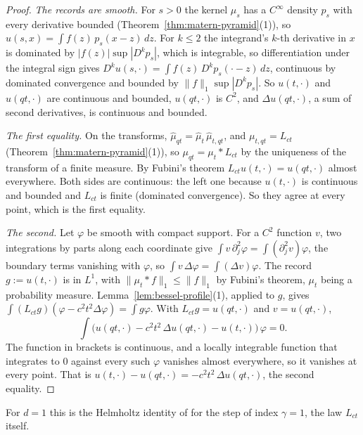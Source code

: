 \begin{proof}
\emph{The records are smooth.} For $s > 0$ the kernel $\mu_s$ has a $C^\infty$ density $p_s$ with
every derivative bounded (Theorem~\ref{thm:matern-pyramid}(1)), so
$u(s, x) = \int f(z)\,p_s(x - z)\,dz$. For $k \le 2$ the integrand's $k$-th derivative in $x$ is
dominated by $|f(z)|\sup|D^kp_s|$, which is integrable, so differentiation under the integral sign
gives $D^ku(s, \cdot) = \int f(z)\,D^kp_s(\cdot - z)\,dz$, continuous by dominated convergence and
bounded by $\|f\|_1\sup|D^kp_s|$. So $u(t, \cdot)$ and $u(qt, \cdot)$ are continuous and bounded,
$u(qt, \cdot)$ is $C^2$, and $\Delta u(qt, \cdot)$, a sum of second derivatives, is continuous and
bounded.

\emph{The first equality.} On the transforms, $\widehat\mu_{qt} = \widehat\mu_t\,\widehat\mu_{t,qt}$, and
$\mu_{t,qt} = L_{ct}$ (Theorem~\ref{thm:matern-pyramid}(1)), so $\mu_{qt} = \mu_t * L_{ct}$ by the
uniqueness of the transform of a finite measure. By Fubini's theorem
$L_{ct}u(t, \cdot) = u(qt, \cdot)$ almost everywhere. Both sides are continuous: the left one
because $u(t, \cdot)$ is continuous and bounded and $L_{ct}$ is finite (dominated convergence). So
they agree at every point, which is the first equality.

\emph{The second.} Let $\varphi$ be smooth with compact support. For a $C^2$ function $v$, two
integrations by parts along each coordinate give $\int v\,\partial_j^2\varphi = \int
(\partial_j^2 v)\varphi$, the boundary terms vanishing with $\varphi$, so
$\int v\,\Delta\varphi = \int (\Delta v)\varphi$. The record $g := u(t, \cdot)$ is in $L^1$, with
$\|\mu_t * f\|_1 \le \|f\|_1$ by Fubini's theorem, $\mu_t$ being a probability measure.
Lemma~\ref{lem:bessel-profile}(1), applied to $g$, gives $\int (L_{ct}g)(\varphi - c^2t^2\Delta\varphi) = \int g\varphi$.
With $L_{ct}g = u(qt, \cdot)$ and $v = u(qt, \cdot)$,
\[
  \int \bigl(u(qt, \cdot) - c^2t^2\,\Delta u(qt, \cdot) - u(t, \cdot)\bigr)\,\varphi = 0 .
\]
The function in brackets is continuous, and a locally integrable function that integrates to $0$
against every such $\varphi$ vanishes almost everywhere, so it vanishes at every point. That is
$u(t, \cdot) - u(qt, \cdot) = -c^2t^2\,\Delta u(qt, \cdot)$, the second equality.
\end{proof}

For $d = 1$ this is the Helmholtz identity of  for the
\Matern{} step of index $\gamma = 1$, the law $L_{ct}$ itself.

